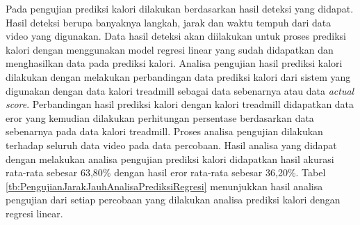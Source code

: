 Pada pengujian prediksi kalori dilakukan berdasarkan hasil deteksi yang didapat. Hasil deteksi berupa banyaknya langkah, jarak dan waktu tempuh dari data video yang digunakan. Data hasil deteksi akan diilakukan untuk proses prediksi kalori dengan menggunakan model regresi linear yang sudah didapatkan dan menghasilkan data pada prediksi kalori. Analisa pengujian hasil prediksi kalori dilakukan dengan melakukan perbandingan data prediksi kalori dari sistem yang digunakan dengan data kalori treadmill sebagai data sebenarnya atau data \emph{actual score}. Perbandingan hasil prediksi kalori dengan kalori treadmill didapatkan data eror yang kemudian dilakukan perhitungan persentase berdasarkan data sebenarnya pada data kalori treadmill. Proses analisa pengujian dilakukan terhadap seluruh data video pada data percobaan. Hasil analisa yang didapat dengan melakukan analisa pengujian prediksi kalori didapatkan hasil akurasi rata-rata sebesar 63,80\% dengan hasil eror rata-rata sebesar 36,20\%. Tabel \ref{tb:PengujianJarakJauhAnalisaPrediksiRegresi} menunjukkan hasil analisa pengujian dari setiap percobaan yang dilakukan analisa prediksi kalori dengan regresi linear.

